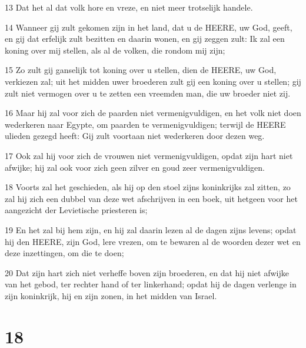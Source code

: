 \par 13 Dat het al dat volk hore en vreze, en niet meer trotselijk handele.
\par 14 Wanneer gij zult gekomen zijn in het land, dat u de HEERE, uw God, geeft, en gij dat erfelijk zult bezitten en daarin wonen, en gij zeggen zult: Ik zal een koning over mij stellen, als al de volken, die rondom mij zijn;
\par 15 Zo zult gij ganselijk tot koning over u stellen, dien de HEERE, uw God, verkiezen zal; uit het midden uwer broederen zult gij een koning over u stellen; gij zult niet vermogen over u te zetten een vreemden man, die uw broeder niet zij.
\par 16 Maar hij zal voor zich de paarden niet vermenigvuldigen, en het volk niet doen wederkeren naar Egypte, om paarden te vermenigvuldigen; terwijl de HEERE ulieden gezegd heeft: Gij zult voortaan niet wederkeren door dezen weg.
\par 17 Ook zal hij voor zich de vrouwen niet vermenigvuldigen, opdat zijn hart niet afwijke; hij zal ook voor zich geen zilver en goud zeer vermenigvuldigen.
\par 18 Voorts zal het geschieden, als hij op den stoel zijns koninkrijks zal zitten, zo zal hij zich een dubbel van deze wet afschrijven in een boek, uit hetgeen voor het aangezicht der Levietische priesteren is;
\par 19 En het zal bij hem zijn, en hij zal daarin lezen al de dagen zijns levens; opdat hij den HEERE, zijn God, lere vrezen, om te bewaren al de woorden dezer wet en deze inzettingen, om die te doen;
\par 20 Dat zijn hart zich niet verheffe boven zijn broederen, en dat hij niet afwijke van het gebod, ter rechter hand of ter linkerhand; opdat hij de dagen verlenge in zijn koninkrijk, hij en zijn zonen, in het midden van Israel.

\chapter{18}

